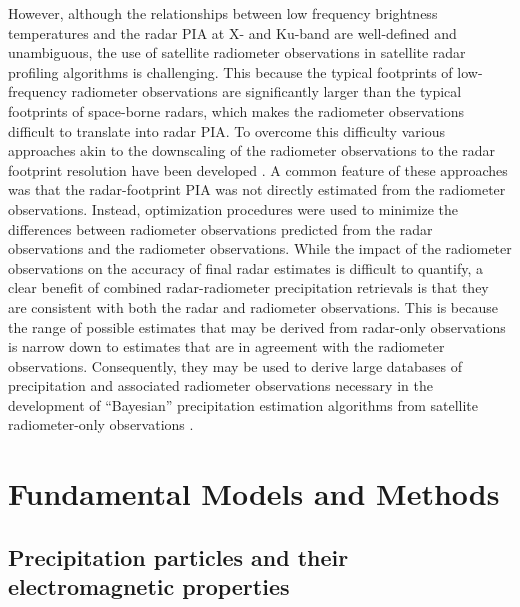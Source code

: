 \documentclass[10pt]{ietbook}
\begin{document}
However, although the relationships between low frequency brightness temperatures and the radar PIA at X- and Ku-band are well-defined and unambiguous, the use of satellite
radiometer observations in satellite radar profiling algorithms is challenging. This because the typical footprints of low-frequency radiometer observations are significantly
larger than the typical footprints of space-borne radars, which makes the radiometer observations difficult to translate into radar PIA. To overcome this difficulty various
approaches akin to the downscaling of the radiometer observations to the radar footprint resolution have been developed \cite{haddad1997,grecu2004,masunaga2005,munchak2011}.
A common feature of these approaches was that the radar-footprint PIA was not directly estimated from the radiometer observations. Instead, 
optimization procedures were used to minimize the differences between radiometer observations predicted from the radar observations and the radiometer observations.  While
the impact of the radiometer observations on the accuracy of final radar estimates is difficult to quantify, a clear benefit of combined radar-radiometer precipitation 
retrievals is
that they are consistent with both the radar and radiometer observations. This is because the range of possible estimates that may be derived from radar-only observations
is narrow down to estimates that are in agreement with the radiometer observations.
Consequently, they may be used to derive large databases of precipitation and associated
radiometer observations
necessary in the development of “Bayesian” precipitation estimation algorithms from satellite
radiometer-only observations \cite{grecu2006,kummerow2011,hou2014}. 

\section{Fundamental Models and Methods}

\subsection{Precipitation particles and their electromagnetic properties}
\end{document}
